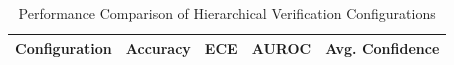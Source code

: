 \begin{table}[h]
\centering
\caption{Performance Comparison of Hierarchical Verification Configurations}
\label{tab:paper1_results}
\begin{tabular}{lcccc}
\hline
Configuration & Accuracy & ECE & AUROC & Avg. Confidence \\
\hline
\hline
\end{tabular}
\end{table}